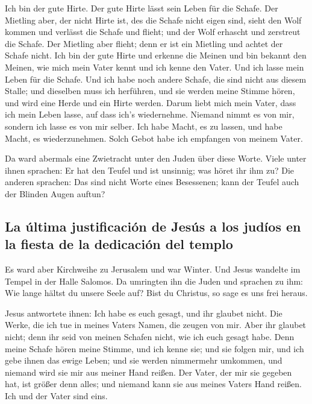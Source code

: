 Ich bin der gute Hirte. Der gute Hirte lässt sein Leben
für die Schafe.  Der Mietling aber, der nicht Hirte ist,
des die Schafe nicht eigen sind, sieht den Wolf kommen und verlässt die
Schafe und flieht; und der Wolf erhascht und zerstreut die Schafe.
 Der Mietling aber flieht; denn er ist ein Mietling und
achtet der Schafe nicht.  Ich bin der gute Hirte und
erkenne die Meinen und bin bekannt den Meinen,  wie mich
mein Vater kennt und ich kenne den Vater. Und ich lasse mein Leben für
die Schafe.  Und ich habe noch andere Schafe, die sind
nicht aus diesem Stalle; und dieselben muss ich herführen, und sie
werden meine Stimme hören, und wird eine Herde und ein Hirte werden.
 Darum liebt mich mein Vater, dass ich mein Leben lasse,
auf dass ich's wiedernehme.  Niemand nimmt es von mir,
sondern ich lasse es von mir selber. Ich habe Macht, es zu lassen, und
habe Macht, es wiederzunehmen. Solch Gebot habe ich empfangen von meinem
Vater.

 Da ward abermals eine Zwietracht unter den Juden über
diese Worte.  Viele unter ihnen sprachen: Er hat den
Teufel und ist unsinnig; was höret ihr ihm zu?  Die
anderen sprachen: Das sind nicht Worte eines Besessenen; kann der Teufel
auch der Blinden Augen auftun?

\hypertarget{la-uxfaltima-justificaciuxf3n-de-jesuxfas-a-los-juduxedos-en-la-fiesta-de-la-dedicaciuxf3n-del-templo}{%
\subsection{La última justificación de Jesús a los judíos en la fiesta
de la dedicación del
templo}\label{la-uxfaltima-justificaciuxf3n-de-jesuxfas-a-los-juduxedos-en-la-fiesta-de-la-dedicaciuxf3n-del-templo}}

 Es ward aber Kirchweihe zu Jerusalem und war Winter.
 Und Jesus wandelte im Tempel in der Halle Salomos.
 Da umringten ihn die Juden und sprachen zu ihm: Wie
lange hältst du unsere Seele auf? Bist du Christus, so sage es uns frei
heraus.

 Jesus antwortete ihnen: Ich habe es euch gesagt, und ihr
glaubet nicht. Die Werke, die ich tue in meines Vaters Namen, die zeugen
von mir.  Aber ihr glaubet nicht; denn ihr seid von
meinen Schafen nicht, wie ich euch gesagt habe.  Denn
meine Schafe hören meine Stimme, und ich kenne sie; und sie folgen mir,
 und ich gebe ihnen das ewige Leben; und sie werden
nimmermehr umkommen, und niemand wird sie mir aus meiner Hand reißen.
 Der Vater, der mir sie gegeben hat, ist größer denn
alles; und niemand kann sie aus meines Vaters Hand reißen.
 Ich und der Vater sind eins.

